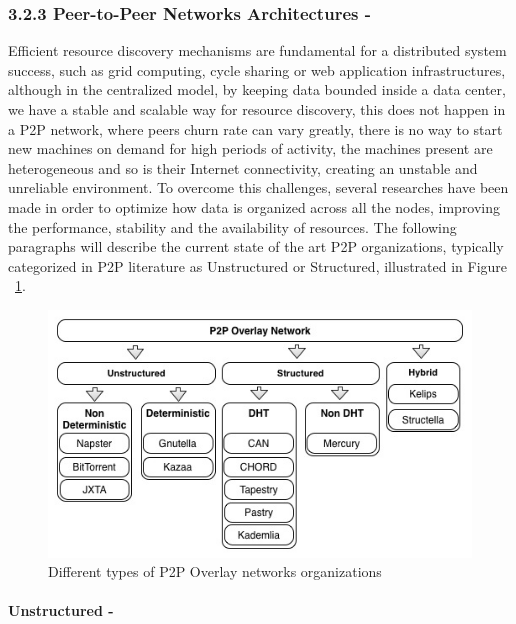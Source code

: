 \documentclass{./llncs2e/llncs}
\begin{document}
\subsubsection{3.2.3 Peer-to-Peer Networks Architectures -}  
Efficient resource discovery mechanisms are fundamental for a distributed system success, such as grid computing, cycle sharing or web application infrastructures\cite{Ranjan2006}, although in the centralized model, by keeping data bounded inside a data center, we have a stable and scalable way for resource discovery, this does not happen in a P2P network, where peers churn rate can vary greatly, there is no way to start new machines on demand for high periods of activity, the machines present are heterogeneous and so is their Internet connectivity, creating an unstable and unreliable environment. To overcome this challenges, several researches have been made in order to optimize how data is organized across all the nodes, improving the performance, stability and the availability of resources. The following paragraphs will describe the current state of the art P2P organizations, typically categorized in P2P literature as Unstructured or Structured\cite{Milojicic2003}, illustrated in Figure ~\ref{fig:Different types of P2P Overlay networks organizations}.

\begin{figure}[bh!]
  \begin{center}
    \includegraphics[width=\textwidth]{./img/p2porganizations.jpg}
  \end{center}
  \caption{Different types of P2P Overlay networks organizations}
  \label{fig:Different types of P2P Overlay networks organizations}
\end{figure}


\paragraph{\textbf{Unstructured -}} %
\label{par:Unstructured}
\end{document}
